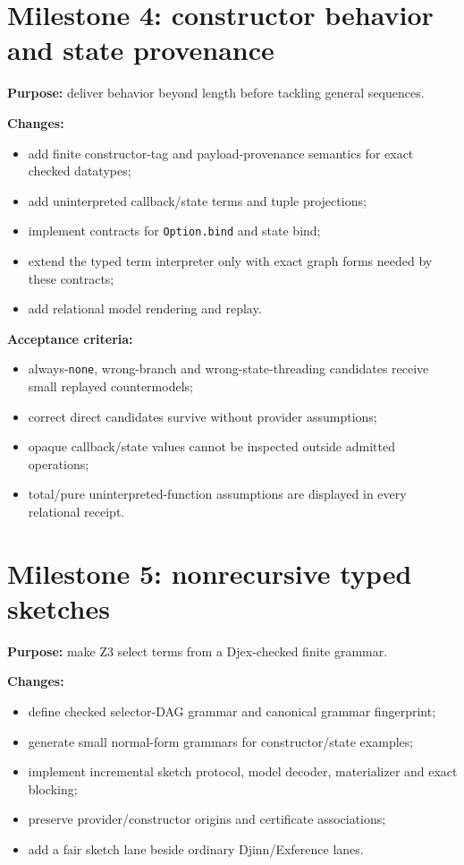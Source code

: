 \documentclass[11pt,oneside]{report}
\newcommand{\code}[1]{\texttt{#1}}
\begin{document}
\section{Milestone 4: constructor behavior and state provenance}

\textbf{Purpose:} deliver behavior beyond length before tackling general sequences.

\textbf{Changes:}

\begin{itemize}[leftmargin=2em]
\item add finite constructor-tag and payload-provenance semantics for exact checked datatypes;
\item add uninterpreted callback/state terms and tuple projections;
\item implement contracts for \code{Option.bind} and state bind;
\item extend the typed term interpreter only with exact graph forms needed by these contracts;
\item add relational model rendering and replay.
\end{itemize}

\textbf{Acceptance criteria:}

\begin{itemize}[leftmargin=2em]
\item always-\code{none}, wrong-branch and wrong-state-threading candidates receive small replayed countermodels;
\item correct direct candidates survive without provider assumptions;
\item opaque callback/state values cannot be inspected outside admitted operations;
\item total/pure uninterpreted-function assumptions are displayed in every relational receipt.
\end{itemize}

\section{Milestone 5: nonrecursive typed sketches}

\textbf{Purpose:} make Z3 select terms from a Djex-checked finite grammar.

\textbf{Changes:}

\begin{itemize}[leftmargin=2em]
\item define checked selector-DAG grammar and canonical grammar fingerprint;
\item generate small normal-form grammars for constructor/state examples;
\item implement incremental sketch protocol, model decoder, materializer and exact blocking;
\item preserve provider/constructor origins and certificate associations;
\item add a fair sketch lane beside ordinary Djinn/Exference lanes.
\end{itemize}
\end{document}
